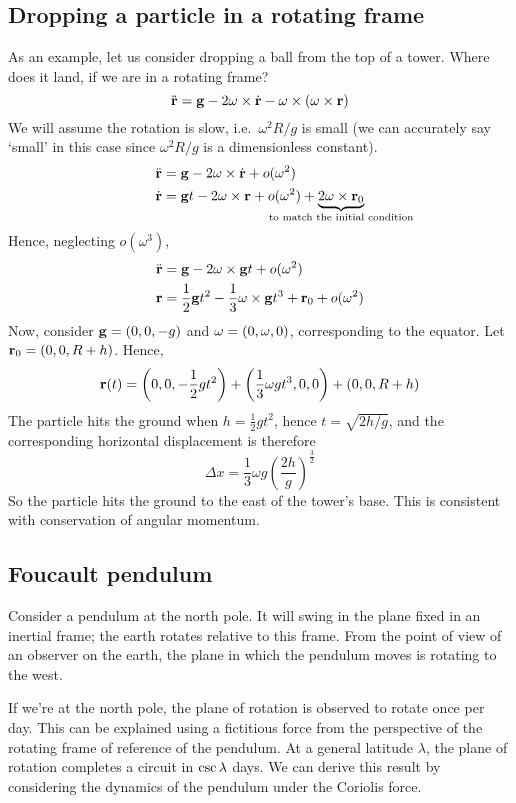 \subsection{Dropping a particle in a rotating frame}
As an example, let us consider dropping a ball from the top of a tower.
Where does it land, if we are in a rotating frame?
\[
	\ddot{\vb{r}} = \vb g - 2\vb\omega \times \dot{\vb{r}} - \vb\omega \times (\vb\omega \times \vb r)
\]
We will assume the rotation is slow, i.e.\ \(\omega^2 R / g\) is small (we can accurately say `small' in this case since \(\omega^2R/g\) is a dimensionless constant).
\begin{align*}
	\rddot & = \vb g - 2\omega \times \rdot + o(\omega^2)                                                                                          \\
	\rdot  & = \vb gt - 2\omega \times \vb r + o(\omega^2) + \underbrace{2\omega\times \vb r_0}_{\mathclap{\text{to match the initial condition}}}
\end{align*}
Hence, neglecting \(o(\omega^3)\),
\begin{align*}
	\ddot{\vb{r}} & = \vb g - 2\omega \times \vb gt + o(\omega^2)                                       \\
	\vb r  & = \frac{1}{2}\vb gt^2 - \frac{1}{3}\vb\omega\times \vb gt^3 + \vb r_0 + o(\omega^2)
\end{align*}
Now, consider \(\vb g = (0, 0, -g)\) and \(\vb\omega = (0, \omega, 0)\), corresponding to the equator.
Let \(\vb r_0 = (0, 0, R + h)\).
Hence,
\[
	\vb r(t) = \qty(0, 0, -\frac{1}{2}gt^2) + \qty(\frac{1}{3}\omega g t^3, 0, 0) + (0, 0, R + h)
\]
The particle hits the ground when \(h = \frac{1}{2}gt^2\), hence \(t = \sqrt{2h/g}\), and the corresponding horizontal displacement is therefore
\[
	\Delta x = \frac{1}{3}\omega g \left( \frac{2h}{g} \right)^{\frac{3}{2}}
\]
So the particle hits the ground to the east of the tower's base.
This is consistent with conservation of angular momentum.

\subsection{Foucault pendulum}
Consider a pendulum at the north pole.
It will swing in the plane fixed in an inertial frame; the earth rotates relative to this frame.
From the point of view of an observer on the earth, the plane in which the pendulum moves is rotating to the west.

If we're at the north pole, the plane of rotation is observed to rotate once per day.
This can be explained using a fictitious force from the perspective of the rotating frame of reference of the pendulum.
At a general latitude \(\lambda\), the plane of rotation completes a circuit in \(\cosecant\lambda\) days.
We can derive this result by considering the dynamics of the pendulum under the Coriolis force.
